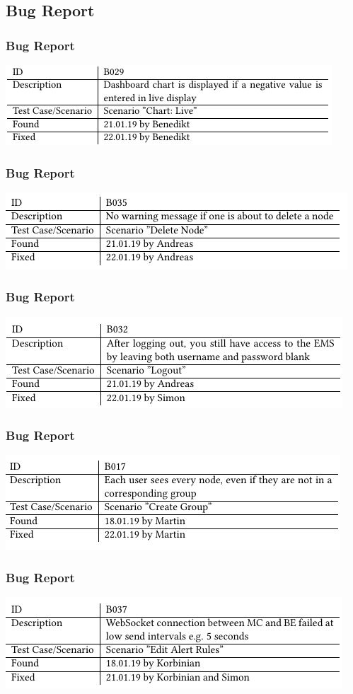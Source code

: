 \documentclass[aspectratio=1610,20pt,utf8]{beamer}
\begin{document}

\subsection{Bug Report}
\begin{frame}
\frametitle{Bug Report}
\includegraphics{bug01.jpg}
\end{frame}

\begin{frame}
\frametitle{Bug Report}
\includegraphics{bug02.jpg}
\end{frame}

\begin{frame}
\frametitle{Bug Report}
\includegraphics{bug03.jpg}
\end{frame}

\begin{frame}
\frametitle{Bug Report}
\includegraphics{bug04.jpg}
\end{frame}

\begin{frame}
\frametitle{Bug Report}
\includegraphics{bug05.jpg}
\end{frame}
\end{document}
